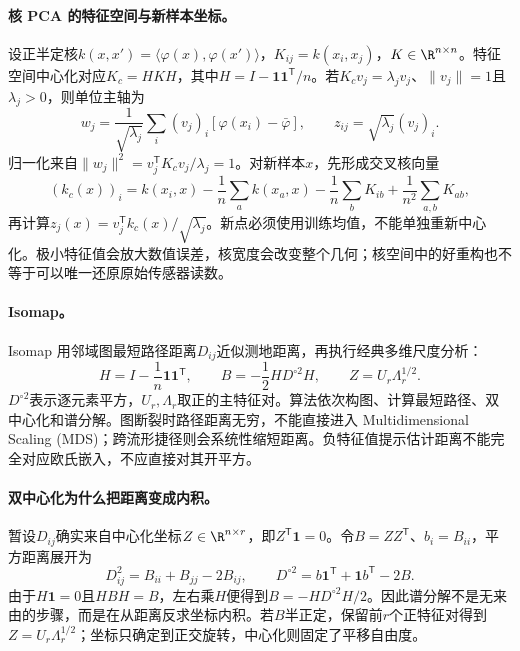 \paragraph{核 PCA 的特征空间与新样本坐标。}
设正半定核$k(x,x')=\langle\varphi(x),\varphi(x')\rangle$，$K_{ij}=k(x_i,x_j)$，$K\in\R^{n\times n}$。特征空间中心化对应$K_c=HKH$，其中$H=I-\mathbf1\mathbf1^{\mathsf T}/n$。若$K_cv_j=\lambda_jv_j$、$\|v_j\|=1$且$\lambda_j>0$，则单位主轴为
\begin{equation}
 w_j=\frac1{\sqrt{\lambda_j}}\sum_i(v_j)_i
 [\varphi(x_i)-\bar\varphi],\qquad
 z_{ij}=\sqrt{\lambda_j}(v_j)_i.
\end{equation}
归一化来自$\|w_j\|^2=v_j^{\mathsf T}K_cv_j/\lambda_j=1$。对新样本$x$，先形成交叉核向量
\begin{equation}
 (k_c(x))_i=k(x_i,x)-\frac1n\sum_a k(x_a,x)
 -\frac1n\sum_bK_{ib}+\frac1{n^2}\sum_{a,b}K_{ab},
\end{equation}
再计算$z_j(x)=v_j^{\mathsf T}k_c(x)/\sqrt{\lambda_j}$。新点必须使用训练均值，不能单独重新中心化。极小特征值会放大数值误差，核宽度会改变整个几何；核空间中的好重构也不等于可以唯一还原原始传感器读数。

\paragraph{Isomap。}
Isomap 用邻域图最短路径距离$D_{ij}$近似测地距离，再执行经典多维尺度分析\cite{tenenbaum2000isomap}：
\begin{equation}
 H=I-\frac1n\mathbf1\mathbf1^{\mathsf T},\qquad
 B=-\frac12H D^{\circ2}H,\qquad Z=U_r\Lambda_r^{1/2}.
\end{equation}
$D^{\circ2}$表示逐元素平方，$U_r,\Lambda_r$取正的主特征对。算法依次构图、计算最短路径、双中心化和谱分解。图断裂时路径距离无穷，不能直接进入 Multidimensional Scaling (MDS)；跨流形捷径则会系统性缩短距离。负特征值提示估计距离不能完全对应欧氏嵌入，不应直接对其开平方。

\paragraph{双中心化为什么把距离变成内积。}
暂设$D_{ij}$确实来自中心化坐标$Z\in\R^{n\times r}$，即$Z^{\mathsf T}\mathbf1=0$。令$B=ZZ^{\mathsf T}$、$b_i=B_{ii}$，平方距离展开为
\begin{equation}
 D_{ij}^2=B_{ii}+B_{jj}-2B_{ij},\qquad
 D^{\circ2}=b\mathbf1^{\mathsf T}+\mathbf1b^{\mathsf T}-2B.
\end{equation}
由于$H\mathbf1=0$且$HBH=B$，左右乘$H$便得到$B=-HD^{\circ2}H/2$。因此谱分解不是无来由的步骤，而是在从距离反求坐标内积。若$B$半正定，保留前$r$个正特征对得到$Z=U_r\Lambda_r^{1/2}$；坐标只确定到正交旋转，中心化则固定了平移自由度。


